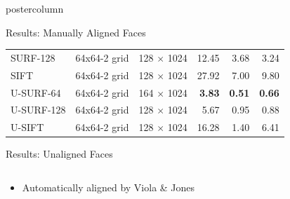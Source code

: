 \documentclass[final,hyperref={pdfpagelabels=false}]{beamer}
\newcommand{\pphantom}{\textcolor{ta3aluminium}} %
\begin{document}
\begin{frame}
\begin{columns}
\begin{column}{.33\textwidth}
\begin{beamercolorbox}[center,wd=\textwidth]{postercolumn}
\begin{minipage}[T]{.95\textwidth}
{\begin{block}{Results: Manually Aligned Faces}
\begin{table}
\begin{tabular}{@{} p{.2\linewidth} p{.18\linewidth} p{.25\linewidth} r r r @{}}
                  SURF-128   & 64x64-2 grid  & 128 $\times$ 1024                                    &  12.45        &  3.68             & 3.24      \\
                  SIFT       &  64x64-2 grid & 128 $\times$ 1024                                    & 27.92         &  7.00             & 9.80      \\
                  \addlinespace
                  U-SURF-64  & 64x64-2 grid  & \pphantom{1}64  $\times$ 1024                        & \textbf{3.83} &   \textbf{0.51}   & \textbf{0.66}    \\
                  U-SURF-128 & 64x64-2 grid  & 128 $\times$ 1024                                    & 5.67          &  0.95             & 0.88      \\
                  U-SIFT     & 64x64-2 grid  & 128 $\times$ 1024                                    & 16.28         &  1.40             & 6.41      \\
                  \bottomrule
                \end{tabular}
              \end{table}
            \end{block}
            \vfill
            \begin{block}{Results: Unaligned Faces}
              \begin{columns}
                \begin{column}{.59\textwidth}
                  \begin{itemize}
                  \item Automatically aligned by Viola \& Jones
                  \end{itemize}
                \end{column}
\end{columns}
\end{block}}
\end{minipage}
\end{beamercolorbox}
\end{column}
\end{columns}
\end{frame}
\end{document}
